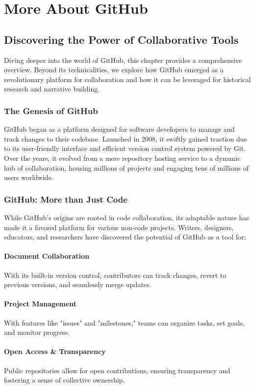 \documentclass{book}
\begin{document}
\chapter{More About GitHub}
\section*{Discovering the Power of Collaborative Tools}
Diving deeper into the world of GitHub, this chapter provides a comprehensive overview. Beyond its technicalities, we explore how GitHub emerged as a revolutionary platform for collaboration and how it can be leveraged for historical research and narrative building.

\subsection*{The Genesis of GitHub}
GitHub began as a platform designed for software developers to manage and track changes to their codebase. Launched in 2008, it swiftly gained traction due to its user-friendly interface and efficient version control system powered by Git. Over the years, it evolved from a mere repository hosting service to a dynamic hub of collaboration, housing millions of projects and engaging tens of millions of users worldwide.

\subsection*{GitHub: More than Just Code}
While GitHub's origins are rooted in code collaboration, its adaptable nature has made it a favored platform for various non-code projects. Writers, designers, educators, and researchers have discovered the potential of GitHub as a tool for:

\subsubsection*{Document Collaboration}
With its built-in version control, contributors can track changes, revert to previous versions, and seamlessly merge updates.

\subsubsection*{Project Management}
With features like "issues" and "milestones," teams can organize tasks, set goals, and monitor progress.

\subsubsection*{Open Access \& Transparency}
Public repositories allow for open contributions, ensuring transparency and fostering a sense of collective ownership.
\end{document}
